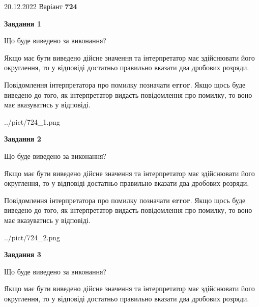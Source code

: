 \documentclass[12pt, ukrainian]{article}
\begin{document}
{20.12.2022 Варіант \No \textbf { 724 }\par}
{
\begin {Large}

{\begin {center}\textbf{Завдання 1}\end {center}}\par
Що буде виведено за виконання? \par

Якщо має бути виведено дійсне значення та інтерпретатор має здійснювати його округлення, 
то у відповіді достатньо правильно вказати два дробових розряди.

Повідомлення інтерпретатора про помилку позначати \textbf{error}.
Якщо щось буде виведено до того, як інтерпретатор видасть повідомлення про помилку, 
то воно має вказуватись у відповіді. \par

\begin{center}
	{../pict/724_1.png}
\end{center}
\newpage

{\begin {center}\textbf{Завдання 2}\end {center}}\par
Що буде виведено за виконання? \par

Якщо має бути виведено дійсне значення та інтерпретатор має здійснювати його округлення, 
то у відповіді достатньо правильно вказати два дробових розряди.

Повідомлення інтерпретатора про помилку позначати \textbf{error}.
Якщо щось буде виведено до того, як інтерпретатор видасть повідомлення про помилку, 
то воно має вказуватись у відповіді. \par

\begin{center}
	{../pict/724_2.png}
\end{center}
\newpage

{\begin {center}\textbf{Завдання 3}\end {center}}\par
Що буде виведено за виконання? \par

Якщо має бути виведено дійсне значення та інтерпретатор має здійснювати його округлення, 
то у відповіді достатньо правильно вказати два дробових розряди.


\end{Large}}
\end{document}
